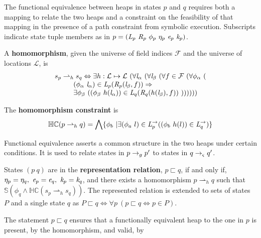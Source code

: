 The functional equivalence between heaps in states $p$
and $q$ requires both a mapping to relate the two heaps and a
constraint on the feasibility of that mapping in the presence of a
path constraint from symbolic execution. Subscripts indicate state tuple
members as in $p = (
\emph{L}_p\ \emph{R}_p\ \phi_p\ \eta_p\ \emph{e}_p\ \emph{k}_p )$.
\begin{definition}
\label{def:homomorphism}
A \textbf{homomorphism}, given the universe of field indices $\mathcal{F}$ and the universe of locations $\mathcal{L}$, is 
$$
\begin{array}{l}
 s_p \rightharpoonup_{h} s_q \Leftrightarrow 
\exists h: \mathcal{L} \mapsto \mathcal{L}\ (\forall \cfgnt{l}_\alpha\ (\forall \cfgnt{l}_\beta\ (\forall f \in \mathcal{F}\ ( \forall \phi_\alpha\ (\\ 
\ \ \ \ \ \ \ \ (\phi_\alpha\ \cfgnt{l}_\alpha) \in \cfgnt{L}_p(\cfgnt{R}_p (\cfgnt{l}_\beta,f )) \Rightarrow \\
\ \ \ \ \ \ \ \ \exists \phi_\beta\ ( (\phi_\beta\ h(\cfgnt{l}_\alpha))\in \cfgnt{L}_q(\cfgnt{R}_q (h(\cfgnt{l}_\beta),f ))\ 
 )) ) ) ) )
\end{array}
$$
\end{definition}
\begin{definition}
\label{def:hc}
The \textbf{homomorphism constraint} is
\[
\mathbb{HC}(p \rightharpoonup_{h} q) = 
\bigwedge \{ \phi_b\ | \exists (\phi_a\ l) \in \emph{L}_p^\rightarrow ( (\phi_b\ h(l)) \in \emph{L}_q^\rightarrow)\}
\]
\end{definition}
Functional equivalence asserts a common structure in the two heaps under certain
conditions. It is used to relate states in $p \rightarrow_{g}
p^\prime$ to states in $q \rightarrow_{\varsigma} q^\prime$.
\begin{definition}
\label{representation}
States $(p\ q)$ are in the \textbf{representation relation}, $p \sqsubset q$, if and only if, $\eta_p = \eta_q ,\ \cfgnt{e}_p =
\cfgnt{e}_q ,\ \cfgnt{k}_p = \cfgnt{k}_q$, and there exists a
homomorphism $p \rightharpoonup_{h} q$
such that $\mathbb{S}( \phi_q \wedge \mathbb{HC}(s_p \rightharpoonup_{h} s_q) )$.
The represented relation is extended to sets of states $P$ and a single state $q$ as
$P \sqsubset q \Longleftrightarrow \forall p\ (p \sqsubset q \Leftrightarrow p \in P)$.
\end{definition}
The statement $p \sqsubset q$ ensures that a functionally equivalent
heap to the one in $p$ is present, by the homomorphism, and valid, by
